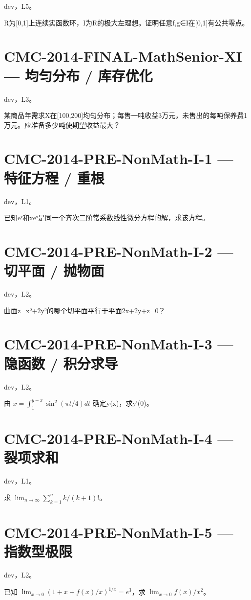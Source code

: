 \documentclass[UTF8]{ctexart}
\begin{document}
dev，L5。

R为[0,1]上连续实函数环，I为R的极大左理想。证明任意f,g∈I在[0,1]有公共零点。

\section*{CMC-2014-FINAL-MathSenior-XI — 均匀分布 / 库存优化}

dev，L3。

某商品年需求X在[100,200]均匀分布；每售一吨收益3万元，未售出的每吨保养费1万元。应准备多少吨使期望收益最大？

\section*{CMC-2014-PRE-NonMath-I-1 — 特征方程 / 重根}

dev，L1。

已知eˣ和xeˣ是同一个齐次二阶常系数线性微分方程的解，求该方程。

\section*{CMC-2014-PRE-NonMath-I-2 — 切平面 / 抛物面}

dev，L2。

曲面z=x²+2y²的哪个切平面平行于平面2x+2y+z=0？

\section*{CMC-2014-PRE-NonMath-I-3 — 隐函数 / 积分求导}

dev，L2。

由 $x=\int_1^{y-x}\sin^2(\pi t/4)dt$ 确定y(x)，求y′(0)。

\section*{CMC-2014-PRE-NonMath-I-4 — 裂项求和}

dev，L1。

求 $\lim_{n\to\infty}\sum_{k=1}^n k/(k+1)!$。

\section*{CMC-2014-PRE-NonMath-I-5 — 指数型极限}

dev，L2。

已知 $\lim_{x\to0}(1+x+f(x)/x)^{1/x}=e^3$，求 $\lim_{x\to0}f(x)/x^2$。
\end{document}
